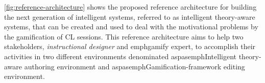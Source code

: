 
 




\autoref{fig:reference-architecture} shows the proposed reference architecture for building the next generation of
intelligent systems, referred to as intelligent theory-aware systems, that can be created and used to deal with the
motivational problems by the gamification of CL sessions. This reference architecture aims to help two stakeholders,
\emph{instructional designer} and emph{gamify expert}, to accomplish their activities in two different environments
denominated aspas{emph{Intelligent theory-aware authoring environment}} and aspas{emph{Gamification-framework editing
environment}.}

